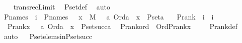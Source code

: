 \begin{isabellebody}
%
\isadelimproof
\ \ %
\endisadelimproof
%
\isatagproof
{}\isamarkupfalse%
\ transrec{}{\isacharunderscore}{\kern0pt}Limit\ \isamarkupfalse%
\ P{\isacharunderscore}{\kern0pt}set{\isacharunderscore}{\kern0pt}def\ \isamarkupfalse%
\ auto%
\endisatagproof
{\isafoldproof}%
%
\isadelimproof
\ \isanewline
%
\endisadelimproof
\ \ \ \ \isanewline
{}\isamarkupfalse%
\ P{\isacharunderscore}{\kern0pt}names\ {\isacharcolon}{\kern0pt}{\isacharcolon}{\kern0pt}\ {\isachardoublequoteopen}i{\isachardoublequoteclose}\ \ {\isachardoublequoteopen}P{\isacharunderscore}{\kern0pt}names\ {\isasymequiv}\ {\isacharbraceleft}{\kern0pt}\ x\ {\isasymin}\ M\ {\isachardot}{\kern0pt}\ {\isasymexists}\ a{\isachardot}{\kern0pt}\ Ord{\isacharparenleft}{\kern0pt}a{\isacharparenright}{\kern0pt}\ {\isasymand}\ x\ {\isasymin}\ P{\isacharunderscore}{\kern0pt}set{\isacharparenleft}{\kern0pt}a{\isacharparenright}{\kern0pt}\ {\isacharbraceright}{\kern0pt}{\isachardoublequoteclose}\ \isanewline
\isanewline
{}\isamarkupfalse%
\ P{\isacharunderscore}{\kern0pt}rank\ {\isacharcolon}{\kern0pt}{\isacharcolon}{\kern0pt}\ {\isachardoublequoteopen}i\ {\isasymRightarrow}\ i{\isachardoublequoteclose}\ \ \isanewline
\ \ {\isachardoublequoteopen}P{\isacharunderscore}{\kern0pt}rank{\isacharparenleft}{\kern0pt}x{\isacharparenright}{\kern0pt}\ {\isasymequiv}\ {\isasymmu}\ a{\isachardot}{\kern0pt}\ Ord{\isacharparenleft}{\kern0pt}a{\isacharparenright}{\kern0pt}\ {\isasymand}\ x\ {\isasymin}\ P{\isacharunderscore}{\kern0pt}set{\isacharparenleft}{\kern0pt}succ{\isacharparenleft}{\kern0pt}a{\isacharparenright}{\kern0pt}{\isacharparenright}{\kern0pt}{\isachardoublequoteclose}\ \isanewline
\isanewline
{}\isamarkupfalse%
\ P{\isacharunderscore}{\kern0pt}rank{\isacharunderscore}{\kern0pt}ord\ {\isacharcolon}{\kern0pt}\ {\isachardoublequoteopen}Ord{\isacharparenleft}{\kern0pt}P{\isacharunderscore}{\kern0pt}rank{\isacharparenleft}{\kern0pt}x{\isacharparenright}{\kern0pt}{\isacharparenright}{\kern0pt}{\isachardoublequoteclose}\ \isanewline
%
\isadelimproof
\ \ %
\endisadelimproof
%
\isatagproof
{}\isamarkupfalse%
\ P{\isacharunderscore}{\kern0pt}rank{\isacharunderscore}{\kern0pt}def\ \isamarkupfalse%
\ auto%
\endisatagproof
{\isafoldproof}%
%
\isadelimproof
\ \isanewline
%
\endisadelimproof
\isanewline
{}\isamarkupfalse%
\ P{\isacharunderscore}{\kern0pt}set{\isacharunderscore}{\kern0pt}elems{\isacharunderscore}{\kern0pt}in{\isacharunderscore}{\kern0pt}P{\isacharunderscore}{\kern0pt}set{\isacharunderscore}{\kern0pt}succ\ {\isacharcolon}{\kern0pt}\ \isanewline

\end{isabellebody}
